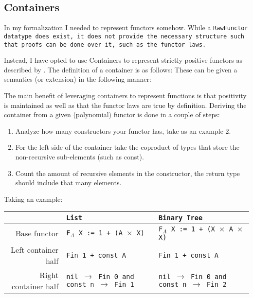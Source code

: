 
\subsection{Containers}
In my formalization I needed to represent functors somehow.
While a \tt{RawFunctor} datatype does exist, it does not provide the necessary structure such that proofs can be done over it, such as the functor laws.

Instead, I have opted to use Containers to represent strictly positive functors as described by \cite{Abbott2005}.
The definition of a container is as follows:
These can be given a semantics (or extension) in the following manner:

The main benefit of leveraging containers to represent functions is that positivity is maintained as well as that the functor laws are true by definition.
Deriving the container from a given (polynomial) functor is done in a couple of steps:
\begin{enumerate}
    \item Analyze how many constructors your functor has, take as an example 2.
    \item For the left side of the container take the coproduct of types that store the non-recursive sub-elements (such as const).
    \item Count the amount of recursive elements in the constructor, the return type should include that many elements.
\end{enumerate}
Taking an example:
\begin{table}[h]
  \begin{tabular}{|r|l|l|}\hline
     & \tt{List} &  \tt{Binary Tree} \\\hline
    Base functor         & \tt{F$_A$ X := 1 + (A $\times$ X)}  & \tt{F$_A$ X := 1 + (X $\times$ A $\times$ X)} \\\hline
    Left container half  & \tt{Fin 1 + const A} & \tt{Fin 1 + const A} \\\hline
    Right container half & \tt{nil $\to$ Fin 0 and const n $\to$ Fin 1} & \tt{nil $\to$ Fin 0 and const n $\to$ Fin 2} \\\hline
  \end{tabular}
\end{table}
